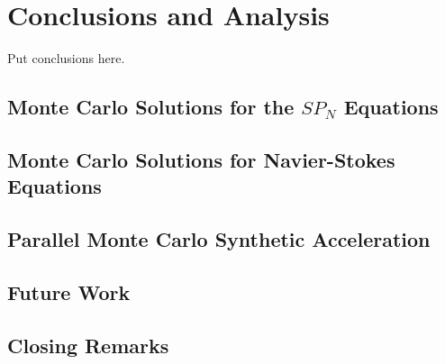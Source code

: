 \chapter{Conclusions and Analysis\ }
\label{ch:conclusion}
Put conclusions here.

\section{Monte Carlo Solutions for the $SP_N$ Equations\ }
\label{sec:spn_conclusion}

\section{Monte Carlo Solutions for Navier-Stokes Equations\ }
\label{sec:nonlinear_conclusions}

\section{Parallel Monte Carlo Synthetic Acceleration\ }
\label{sec:parallel_mc_conclusions}

\section{Future Work\ }
\label{sec:future_work}

\section{Closing Remarks\ }
\label{sec:closing}
